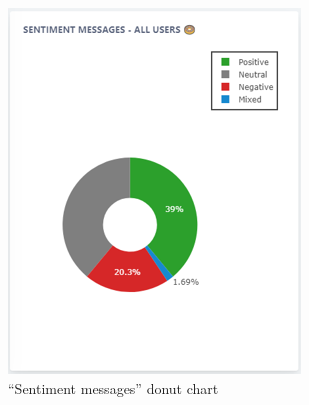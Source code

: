 \documentclass{article}
\begin{document}
\vspace{10pt}
\begin{figure}[H]
\centering
\begin{minipage}{.5\textwidth}
  \centering
  \includegraphics[width=1\linewidth]{charts/sentimentmessages.png}
  \caption{``Sentiment messages'' donut chart}
  \label{fig:sentimentmessages}
\end{minipage}%
\begin{minipage}{.5\textwidth}
  \centering

\end{minipage}
\end{figure}
\end{document}
